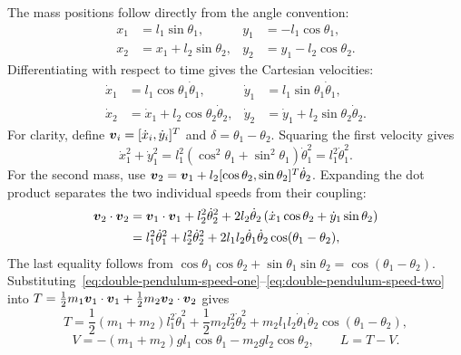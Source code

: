 \documentclass[../main.tex]{subfiles}
\begin{document}
The mass positions follow directly from the angle convention:
\begin{equation}
	\begin{aligned}
		x_1 &= l_1\sin\theta_1, & y_1 &= -l_1\cos\theta_1,\\
		x_2 &= x_1+l_2\sin\theta_2, & y_2 &= y_1-l_2\cos\theta_2.
	\end{aligned}
	\label{eq:double-pendulum-positions}
\end{equation}
Differentiating with respect to time gives the Cartesian velocities:
\begin{equation}
	\begin{aligned}
		\dot x_1 &= l_1\cos\theta_1\dot\theta_1,
		&\dot y_1 &= l_1\sin\theta_1\dot\theta_1,\\
		\dot x_2 &= \dot x_1+l_2\cos\theta_2\dot\theta_2,
		&\dot y_2 &= \dot y_1+l_2\sin\theta_2\dot\theta_2.
	\end{aligned}
	\label{eq:double-pendulum-velocities}
\end{equation}
For clarity, define $\boldsymbol{v}_i=[\dot x_i,\dot y_i]^T$ and $\delta=\theta_1-\theta_2$. Squaring the first velocity gives
\begin{equation}
\dot x_1^2+\dot y_1^2
=l_1^2(\cos^2\theta_1+\sin^2\theta_1)\dot\theta_1^2
=l_1^2\dot\theta_1^2.
\label{eq:double-pendulum-speed-one}
\end{equation}
For the second mass, use $\boldsymbol{v}_2=\boldsymbol{v}_1+l_2[\cos\theta_2,\sin\theta_2]^T\dot\theta_2$. Expanding the dot product separates the two individual speeds from their coupling:
\begin{equation}
\begin{aligned}
\boldsymbol{v}_2\cdot\boldsymbol{v}_2
&=\boldsymbol{v}_1\cdot\boldsymbol{v}_1+l_2^2\dot\theta_2^2
+2l_2\dot\theta_2\left(\dot x_1\cos\theta_2+\dot y_1\sin\theta_2\right)\\
&=l_1^2\dot\theta_1^2+l_2^2\dot\theta_2^2
+2l_1l_2\dot\theta_1\dot\theta_2\cos(\theta_1-\theta_2),
\end{aligned}
\label{eq:double-pendulum-speed-two}
\end{equation}
The last equality follows from $\cos\theta_1\cos\theta_2+\sin\theta_1\sin\theta_2=\cos(\theta_1-\theta_2)$. Substituting~\eqref{eq:double-pendulum-speed-one}--\eqref{eq:double-pendulum-speed-two} into $T=\tfrac12m_1\boldsymbol{v}_1\cdot\boldsymbol{v}_1+\tfrac12m_2\boldsymbol{v}_2\cdot\boldsymbol{v}_2$ gives
\begin{equation}
	T = \frac12(m_1+m_2)l_1^2\dot\theta_1^2
		+ \frac12m_2l_2^2\dot\theta_2^2
		+ m_2l_1l_2\dot\theta_1\dot\theta_2\cos(\theta_1-\theta_2),
	\label{eq:double-pendulum-kinetic-energy}
\end{equation}
\begin{equation}
	V = -(m_1+m_2)gl_1\cos\theta_1 - m_2gl_2\cos\theta_2,
	\qquad L=T-V.
	\label{eq:double-pendulum-potential-lagrangian}
\end{equation}
\end{document}
